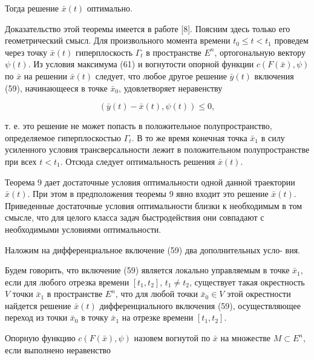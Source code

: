 \documentclass[10pt]{article}
\begin{document}
Тогда решение \(\bar{x}\left( t\right)\) оптимально.

Доказательство этой теоремы имеется в работе [8]. Поясним здесь только его геометрический смысл. Для произвольного момента времени \({t}_{0} \leq  t < {t}_{1}\) проведем через точку \(\bar{x}\left( t\right)\) гиперплоскость \({\Gamma }_{t}\) в пространстве \({E}^{n}\), ортогональную вектору \(\psi \left( t\right)\). Из условия максимума (61) и вогнутости опорной функции \(c\left( {F\left( \bar{x}\right),\psi }\right)\) по \(\bar{x}\) на решении \(\bar{x}\left( t\right)\) следует, что любое другое решение \(\bar{y}\left( t\right)\) включения (59), начинающееся в точке \({\bar{x}}_{0}\), удовлетворяет неравенству

\[
\left( {\bar{y}\left( t\right)  - \bar{x}\left( t\right),\psi \left( t\right) }\right)  \leq  0,
\]

т. е. это решение не может попасть в положительное полупространство, определяемое гиперплоскостью \({\Gamma }_{t}\). В то же время конечная точка \({\bar{x}}_{1}\) в силу усиленного условия трансверсальности лежит в положительном полупространстве при всех \(t < {t}_{1}\). Отсюда следует оптимальность решения \(\bar{x}\left( t\right)\).

Теорема 9 дает достаточные условия оптимальности одной данной траектории \(\bar{x}\left( t\right)\). При этом в предположения теоремы 9 явно входит это решение \(\bar{x}\left( t\right)\). Приведенные достаточные условия оптимальности близки к необходимым в том смысле, что для целого класса задач быстродействия они совпадают с необходимыми условиями оптимальности.

Наложим на дифференциальное включение (59) два дополнительных усло- вия.

Будем говорить, что включение (59) является локально управляемым в точке \({\bar{x}}_{1}\), если для любого отрезка времени \(\left\lbrack  {t}_{1},{t}_{2}\right\rbrack\), \({t}_{1} \neq  {t}_{2}\), существует такая окрестность \(V\) точки \({\bar{x}}_{1}\) в пространстве \({E}^{n}\), что для любой точки \({\bar{x}}_{0} \in  V\) этой окрестности найдется решение \(\bar{x}\left( t\right)\) дифференциального включения (59), осуществляющее переход из точки \({\bar{x}}_{0}\) в точку \({\bar{x}}_{1}\) на отрезке времени \(\left\lbrack  {t}_{1},{t}_{2}\right\rbrack\).

Опорную функцию \(c\left( {F\left( \bar{x}\right),\psi }\right)\) назовем вогнутой по \(\bar{x}\) на множестве \(M \subset  {E}^{n}\), если выполнено неравенство
\end{document}
